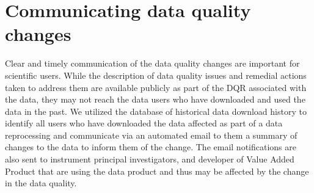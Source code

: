\section{Communicating data quality changes}
Clear and timely communication of the data quality changes are important
for scientific users. While the description of data quality issues and
remedial actions taken to address them are available publicly as part of
the DQR associated with the data, they may not reach the data users who
have downloaded and used the data in the past. We utilized the database
of historical data download history to identify all users who have
downloaded the data affected as part of a data reprocessing and
communicate via an automated email to them a summary of changes to the
data to inform them of the change. The email notifications are also sent
to instrument principal investigators, and developer of Value Added
Product that are using the data product and thus may be affected by the
change in the data quality.


